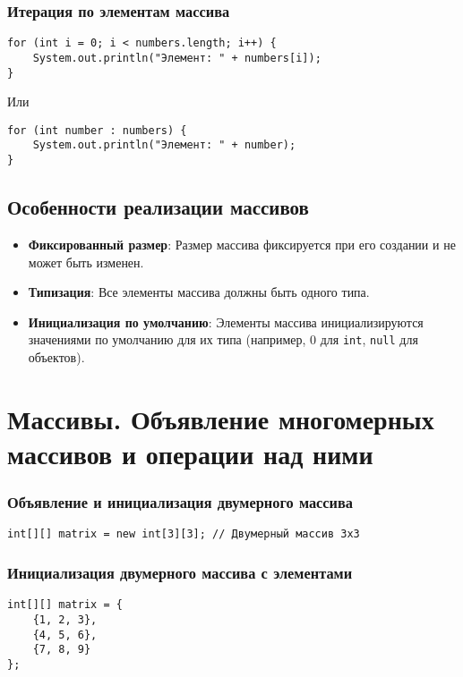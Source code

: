 \documentclass[12pt, a4paper]{article}
\begin{document}
\subsubsection*{Итерация по элементам массива}
\begin{verbatim}
for (int i = 0; i < numbers.length; i++) {
    System.out.println("Элемент: " + numbers[i]);
}
\end{verbatim}

Или

\begin{verbatim}
for (int number : numbers) {
    System.out.println("Элемент: " + number);
}
\end{verbatim}

\subsection*{Особенности реализации массивов}

\begin{itemize}
    \item \textbf{Фиксированный размер}: Размер массива фиксируется при его создании и не может быть изменен.
    \item \textbf{Типизация}: Все элементы массива должны быть одного типа.
    \item \textbf{Инициализация по умолчанию}: Элементы массива инициализируются значениями по умолчанию для их типа (например, 0 для \texttt{int}, \texttt{null} для объектов).
\end{itemize}


\section{Массивы. Объявление многомерных массивов и операции над ними}
\subsubsection*{Объявление и инициализация двумерного массива}

\begin{verbatim}
int[][] matrix = new int[3][3]; // Двумерный массив 3x3
\end{verbatim}

\subsubsection*{Инициализация двумерного массива с элементами}

\begin{verbatim}
int[][] matrix = {
    {1, 2, 3},
    {4, 5, 6},
    {7, 8, 9}
};
\end{verbatim}
\end{document}
